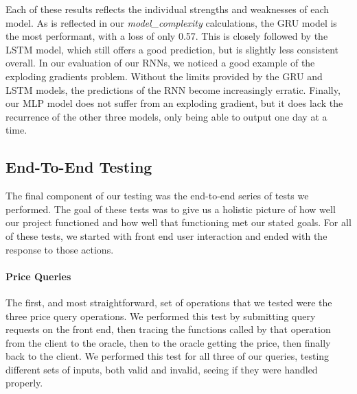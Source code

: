 \documentclass{ledger}
\begin{document}
Each of these results reflects the individual strengths and weaknesses of each model.  As is reflected in our
\textit{model\_complexity} calculations, the GRU model is the most performant, with a loss of only 0.57.  This is
closely followed by the LSTM model, which still offers a good prediction, but is slightly less consistent overall.
In our evaluation of our RNNs, we noticed a good example of the exploding gradients problem.  Without the limits
provided by the GRU and LSTM models, the predictions of the RNN become increasingly erratic.  Finally, our
MLP model does not suffer from an exploding gradient, but it does lack the recurrence of the other three models,
only being able to output one day at a time.

\subsection{End-To-End Testing}

The final component of our testing was the end-to-end series of tests we performed.  The goal of these tests was to
give us a holistic picture of how well our project functioned and how well that functioning met our stated goals.
For all of these tests, we started with front end user interaction and ended with the response to those actions.

\paragraph{Price Queries}
The first, and most straightforward, set of operations that we tested were the three price query operations.
We performed this test by submitting query requests on the front end, then tracing the functions called by that operation
from the client to the oracle, then to the oracle getting the price, then finally back to the client.  We performed
this test for all three of our queries, testing different sets of inputs, both valid and invalid, seeing if they
were handled properly.
\end{document}
